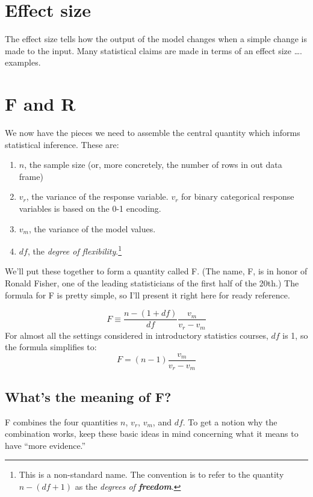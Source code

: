 \documentclass[]{book}
\providecommand{\tightlist}{%
  \setlength{\itemsep}{0pt}\setlength{\parskip}{0pt}}
\let\rmarkdownfootnote\footnote%
\def\footnote{\protect\rmarkdownfootnote}
\begin{document}
\hypertarget{effect-size}{%
\chapter{Effect size}\label{effect-size}}

The effect size tells how the output of the model changes when a simple change is made to the input. Many statistical claims are made in terms of an effect size \ldots{}. examples.

\hypertarget{f-and-r}{%
\chapter{F and R}\label{f-and-r}}

We now have the pieces we need to assemble the central quantity which informs statistical inference. These are:

\begin{enumerate}
\def\labelenumi{\arabic{enumi}.}
\tightlist
\item
  \(n\), the sample size (or, more concretely, the number of rows in out data frame)
\item
  \(v_r\), the variance of the response variable. \(v_r\) for binary categorical response variables is based on the 0-1 encoding.
\item
  \(v_m\), the variance of the model values.
\item
  \(df\), the \emph{degree of flexibility}.\footnote{This is a non-standard name. The convention is to refer to the quantity \(n - (df + 1)\) as the \emph{degrees of \textbf{freedom}}.}
\end{enumerate}

We'll put these together to form a quantity called F. (The name, F, is in honor of Ronald Fisher, one of the leading statisticians of the first half of the 20th.) The formula for F is pretty simple, so I'll present it right here for ready reference.

\[F \equiv \frac{n - (1 + df)}{df} \frac{v_m}{v_r - v_m}\]
For almost all the settings considered in introductory statistics courses, \(df\) is 1, so the formula simplifies to:
\[F =  (n-1) \frac{v_m}{v_r - v_m}\]

\hypertarget{whats-the-meaning-of-f}{%
\section{What's the meaning of F?}\label{whats-the-meaning-of-f}}

F combines the four quantities \(n\), \(v_r\), \(v_m\), and \(df\). To get a notion why the combination works, keep these basic ideas in mind concerning what it means to have ``more evidence.''
\end{document}
